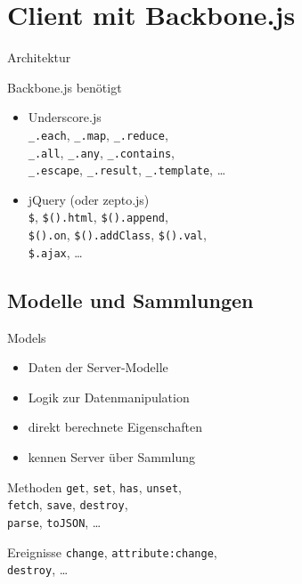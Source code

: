 \section[Client]{Client mit Backbone.js}

\begin{frame}{Architektur}
  \begin{center}
    
  \end{center}
\end{frame}

\begin{frame}{Backbone.js benötigt}
  \begin{itemize}
    \item Underscore.js \\
      \lstinline-_.each-, \lstinline-_.map-,
      \lstinline-_.reduce-, \\
      \lstinline-_.all-, \lstinline-_.any-, \lstinline-_.contains-, \\
      \lstinline-_.escape-, \lstinline-_.result-, \lstinline-_.template-,
      \ldots \\[5ex]
    \item jQuery (oder zepto.js) \\
      \lstinline-$-, \lstinline-$().html-,
      \lstinline-$().append-, \\
      \lstinline-$().on-, \lstinline-$().addClass-, \lstinline-$().val-, \\
      \lstinline-$.ajax-, \ldots
  \end{itemize}
\end{frame}

\subsection{Modelle und Sammlungen}

\begin{frame}{Models}
  \begin{itemize}
    \item Daten der Server-Modelle
    \item Logik zur Datenmanipulation
    \item direkt berechnete Eigenschaften
    \item kennen Server über Sammlung
  \end{itemize}

  \begin{block}{Methoden}
    \lstinline-get-, \lstinline-set-, \lstinline-has-, \lstinline-unset-, \\
    \lstinline-fetch-, \lstinline-save-, \lstinline-destroy-, \\
    \lstinline-parse-, \lstinline-toJSON-, \ldots
  \end{block}
  
  \begin{block}{Ereignisse}
    \lstinline-change-, \lstinline-attribute:change-, \\
    \lstinline-destroy-, \ldots
  \end{block}
\end{frame}

